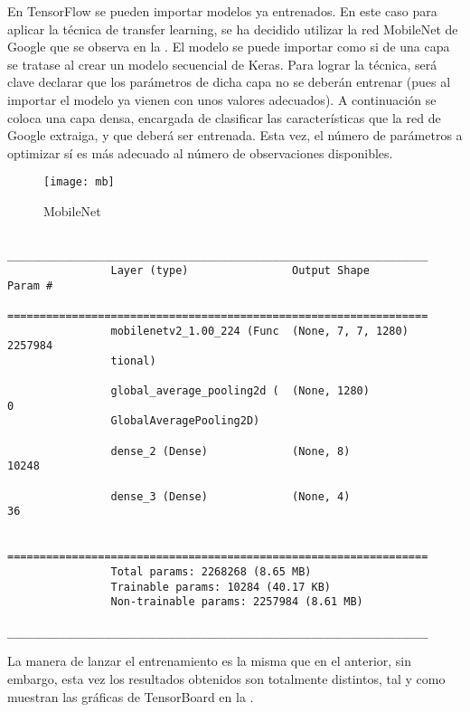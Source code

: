 			En TensorFlow se pueden importar modelos ya entrenados. En este caso para aplicar la técnica de transfer learning, se ha decidido utilizar la red MobileNet de Google que se observa en la . El modelo se puede importar como si de una capa se tratase al crear un modelo secuencial de Keras. Para lograr la técnica, será clave declarar que los parámetros de dicha capa no se deberán entrenar (pues al importar el modelo ya vienen con unos valores adecuados). A continuación se coloca una capa densa, encargada de clasificar las características que la red de Google extraiga, y que deberá ser entrenada. Esta vez, el número de parámetros a optimizar sí es más adecuado al número de observaciones disponibles. 
			
			\begin{figure}[!h]
				\centering
				\texttt{[image: mb]}
				\caption{MobileNet \cite{mobilenet}}
				\label{fig:mb}
			\end{figure}
			
			\begin{verbatim}
				_________________________________________________________________
				Layer (type)                Output Shape              Param #   
				=================================================================
				mobilenetv2_1.00_224 (Func  (None, 7, 7, 1280)        2257984   
				tional)                                                         
				
				global_average_pooling2d (  (None, 1280)              0         
				GlobalAveragePooling2D)                                         
				
				dense_2 (Dense)             (None, 8)                 10248     
				
				dense_3 (Dense)             (None, 4)                 36        
				
				=================================================================
				Total params: 2268268 (8.65 MB)
				Trainable params: 10284 (40.17 KB)
				Non-trainable params: 2257984 (8.61 MB)
				_________________________________________________________________
			\end{verbatim}
			
			La manera de lanzar el entrenamiento es la misma que en el anterior, sin embargo, esta vez los resultados obtenidos son totalmente distintos, tal y como muestran las gráficas de TensorBoard en la . \\
			
